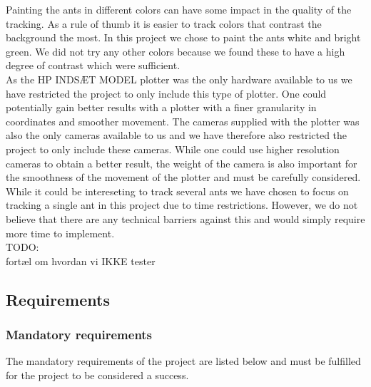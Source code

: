 Painting the ants in different colors can have some impact in the quality of the tracking. As a rule of thumb it is easier to track colors that contrast the background the most. In this project we chose to paint the ants white and bright green. We did not try any other colors because we found these to have a high degree of contrast which were sufficient. \\

As the HP INDSÆT MODEL plotter was the only hardware available to us we have restricted the project to only include this type of plotter. One could potentially gain better results with a plotter with a finer granularity in coordinates and smoother movement. The cameras supplied with the plotter was also the only cameras available to us and we have therefore also restricted the project to only include these cameras. While one could use higher resolution cameras to obtain a better result, the weight of the camera is also important for the smoothness of the movement of the plotter and must be carefully considered.\\

While it could be intereseting to track several ants we have chosen to focus on tracking a single ant in this project due to time restrictions. However, we do not believe that there are any technical barriers against this and would simply require more time to implement.\\

TODO: \\
fortæl om hvordan vi IKKE tester

\subsection{Requirements}

\subsubsection{Mandatory requirements}
The mandatory requirements of the project are listed below and must be fulfilled for the project to be considered a success.

